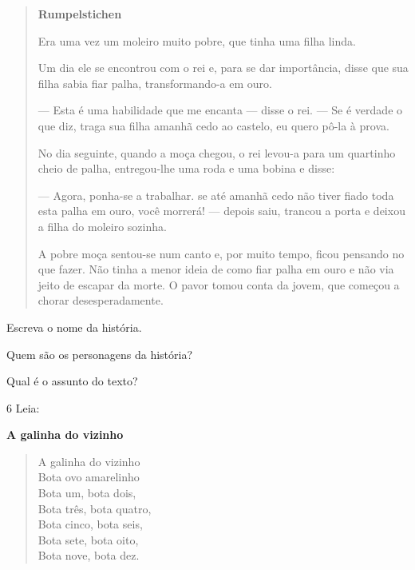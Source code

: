 \begin{quote}
\textbf{Rumpelstichen}

Era uma vez um moleiro muito pobre, que tinha uma filha linda.

Um dia ele se encontrou com o rei e, para se dar importância,
disse que sua filha sabia fiar palha, transformando-a em ouro.

--- Esta é uma habilidade que me encanta --- disse o
rei. --- Se é verdade o que diz, traga sua filha amanhã cedo ao
castelo, eu quero pô-la à prova.

No dia seguinte, quando a moça chegou, o rei levou-a
para um quartinho cheio de palha, entregou-lhe uma roda e uma
bobina e disse:

--- Agora, ponha-se a trabalhar. se até amanhã cedo
não tiver fiado toda esta palha em ouro, você morrerá! ---
depois saiu, trancou a porta e deixou a filha do moleiro
sozinha.

A pobre moça sentou-se num canto e, por muito tempo,
ficou pensando no que fazer. Não tinha a menor ideia de como
fiar palha em ouro e não via jeito de escapar da morte. O
pavor tomou conta da jovem, que começou a chorar
desesperadamente.
\end{quote}


\begin{escolha}
\item Escreva o nome da história.


\item Quem são os personagens da história?


\item Qual é o assunto do texto?

\end{escolha}

\num{6} Leia:

\textbf{A galinha do vizinho}

\begin{verse}
A galinha do vizinho\\
Bota ovo amarelinho\\
Bota um, bota dois,\\
Bota três, bota quatro,\\
Bota cinco, bota seis,\\
Bota sete, bota oito,\\
Bota nove, bota dez.
\end{verse}

